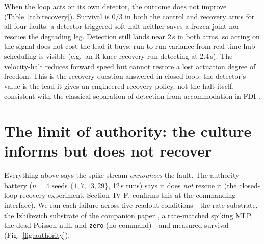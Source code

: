 When the loop acts on its own detector, the outcome does not improve
(Table~\ref{tab:recovery}). Survival is 0/3 in both the control and recovery
arms for all four faults: a detector-triggered soft halt neither saves a
frozen joint nor rescues the degrading leg. Detection still lands near 2\,s in
both arms, so acting on the signal does not cost the lead it buys; run-to-run
variance from real-time hub scheduling is visible (e.g.\ an R-knee recovery
run detecting at 2.4\,s). The velocity-halt reduces forward speed but cannot
restore
a lost actuation degree of freedom. This is the recovery question answered in
closed loop: the detector's value is the lead it gives an engineered recovery
policy, not the halt itself, consistent with the classical separation of
detection from accommodation in FDI \cite{chen1999,isermann2005}.

\begin{table}[t]
\caption{Recovery battery: survival and online detection time per arm
(seeds $\{7, 13, 29\}$, 12\,s runs; detector threshold $3\sigma$, 2
consecutive ticks). OFF = observe-only; ON = detector-triggered soft halt.}
\label{tab:recovery}
\centering
\small
\renewcommand{\arraystretch}{1.15}
\end{table}

\section{The limit of authority: the culture informs but does not recover}

Everything above says the spike stream \emph{announces} the fault. The authority
battery ($n = 4$ seeds $\{1, 7, 13, 29\}$, 12\,s runs) says it does
\emph{not} rescue it (the closed-loop recovery experiment, Section~IV-F,
confirms this at the commanding interface). We ran each failure across five
readout conditions---the
rate substrate, the Izhikevich substrate of the companion paper
\cite{izhikevich2003,izhikevich2004}, a rate-matched
spiking MLP, the dead Poisson null, and \texttt{zero} (no command)---and
measured survival (Fig.~\ref{fig:authority}).

